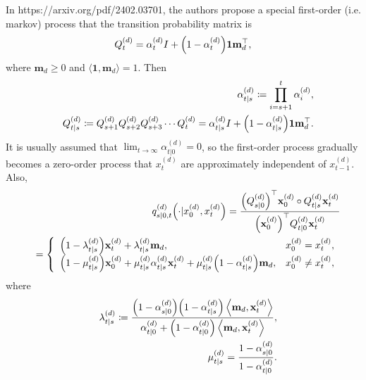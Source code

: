 \documentclass[10pt]{article}
\begin{document}
In https://arxiv.org/pdf/2402.03701, the authors propose a special first-order (i.e. markov) process that the transition probability matrix is
\begin{eqnarray}\label{EqInterpolarQ}
  Q^{(d)}_t = \alpha^{(d)}_t I + \qty(1-\alpha^{(d)}_t)\mathbf{1m}_d^\top,
\end{eqnarray}
where $\mathbf{m}_d\ge 0$ and $\langle\mathbf{1}, \mathbf{m}_d\rangle=1$. Then
\begin{eqnarray*}
  &&\alpha^{(d)}_{t|s}\coloneq \prod_{i=s+1}^t \alpha^{(d)}_i,\\
  &&Q^{(d)}_{t|s}\coloneq Q^{(d)}_{s+1}Q^{(d)}_{s+2}Q^{(d)}_{s+3}\cdots Q^{(d)}_t = \alpha^{(d)}_{t|s} I + \qty(1-\alpha^{(d)}_{t|s})\mathbf{1m}_d^\top.
\end{eqnarray*} 
It is usually assumed that $\lim_{t\to \infty}\alpha^{(d)}_{t|0}=0$, so the first-order process gradually becomes a zero-order process that $x^{(d)}_t$ are approximately independent of $x^{(d)}_{t-1}$. Also,
\begin{eqnarray}\label{EqsOn0tq}
  &&q^{(d)}_{s|0,t}\qty(\cdot|x^{(d)}_0,x^{(d)}_t) = \frac{\qty(Q^{(d)}_{s|0})^\top \mathbf{x}^{(d)}_0\circ Q^{(d)}_{t|s}\mathbf{x}^{(d)}_t}{\qty(\mathbf{x}^{(d)}_0)^\top Q^{(d)}_{t|0}\mathbf{x}^{(d)}_t}\\
  &&=\left\{\begin{array}{ll}
    \qty(1-\lambda^{(d)}_{t|s})\mathbf{x}^{(d)}_t + \lambda^{(d)}_{t|s}\mathbf{m}_d, & x_0^{(d)}=x^{(d)}_t,\\
    \qty(1-\mu^{(d)}_{t|s})\mathbf{x}^{(d)}_0 + \mu^{(d)}_{t|s}\alpha^{(d)}_{t|s}\mathbf{x}^{(d)}_t + \mu^{(d)}_{t|s}\qty(1-\alpha^{(d)}_{t|s})\mathbf{m}_d, & x_0^{(d)}\neq x_t^{(d)},
  \end{array}\right.
\end{eqnarray}
where
\begin{eqnarray*}
  &&\lambda^{(d)}_{t|s}\coloneq\frac{\qty(1-\alpha^{(d)}_{s|0})\qty(1-\alpha^{(d)}_{t|s})\left\langle \mathbf{m}_d,\mathbf{x}^{(d)}_t\right\rangle}{\alpha^{(d)}_{t|0} + \qty(1-\alpha^{(d)}_{t|0})\left\langle \mathbf{m}_d,\mathbf{x}^{(d)}_t\right\rangle},\\
  &&\mu^{(d)}_{t|s}=\frac{1-\alpha^{(d)}_{s|0}}{1-\alpha^{(d)}_{t|0}}.
\end{eqnarray*}
\end{document}
